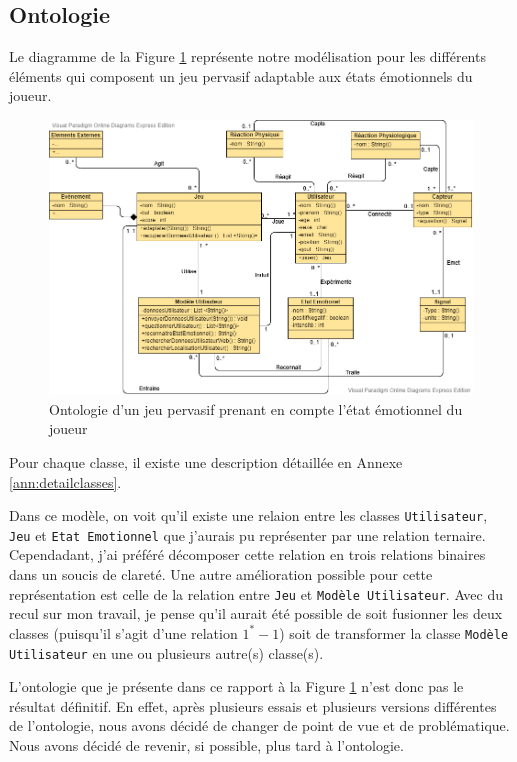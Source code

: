 \documentclass{article}
\begin{document}
	\subsection{Ontologie}\label{sec:ontologie}
		Le diagramme de la Figure \ref{fig:modele} représente notre modélisation pour les différents éléments qui composent un jeu pervasif adaptable aux états émotionnels du joueur.
		\begin{figure}[ht]
			\centering
			\includegraphics[scale=0.5]{../include/ontologie_stage_cnam-v2-5.png}
			\caption{Ontologie d'un jeu pervasif prenant en compte l'état émotionnel du joueur}
			\label{fig:modele}
		\end{figure}
		Pour chaque classe, il existe une description détaillée en Annexe \ref{ann:detailclasses}.\par
		Dans ce modèle, on voit qu'il existe une relaion entre les classes \texttt{Utilisateur}, \texttt{Jeu} et \texttt{Etat Emotionnel} que j'aurais pu représenter par une relation ternaire. 
		Cependadant, j'ai préféré décomposer cette relation en trois relations binaires dans un soucis de clareté. 
		Une autre amélioration possible pour cette représentation est celle de la relation entre \texttt{Jeu} et \texttt{Modèle Utilisateur}. 
		Avec du recul sur mon travail, je pense qu'il aurait été possible de soit fusionner les deux classes (puisqu'il s'agit d'une relation $1^* - 1$) soit de transformer la classe \texttt{Modèle Utilisateur} en une ou plusieurs autre(s) classe(s).\par
		L'ontologie que je présente dans ce rapport à la Figure \ref{fig:modele} n'est donc pas le résultat définitif.
		En effet, après plusieurs essais et plusieurs versions différentes de l'ontologie, nous avons décidé de changer de point de vue et de problématique.
		Nous avons décidé de revenir, si possible, plus tard à l'ontologie.
\end{document}
